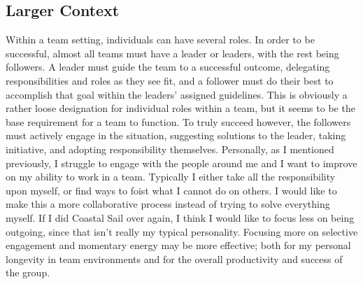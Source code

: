 \documentclass[12pt]{article}
\begin{document}
\subsection*{Larger Context}
\label{sec:org682186c}
Within a team setting, individuals can have several roles. In order to be successful, almost all teams must have a leader or leaders, with the rest being followers. A leader must guide the team to a successful outcome, delegating responsibilities and roles as they see fit, and a follower must do their best to accomplish that goal within the leaders' assigned guidelines. This is obviously a rather loose designation for individual roles within a team, but it seems to be the base requirement for a team to function. To truly succeed however, the followers must actively engage in the situation, suggesting solutions to the leader, taking initiative, and adopting responsibility themselves. Personally, as I mentioned previously, I struggle to engage with the people around me and I want to improve on my ability to work in a team. Typically I either take all the responsibility upon myself, or find ways to foist what I cannot do on others. I would like to make this a more collaborative process instead of trying to solve everything myself. If I did Coastal Sail over again, I think I would like to focus less on being outgoing, since that isn't really my typical personality. Focusing more on selective engagement and momentary energy may be more effective; both for my personal longevity in team environments and for the overall productivity and success of the group. 
\end{document}
